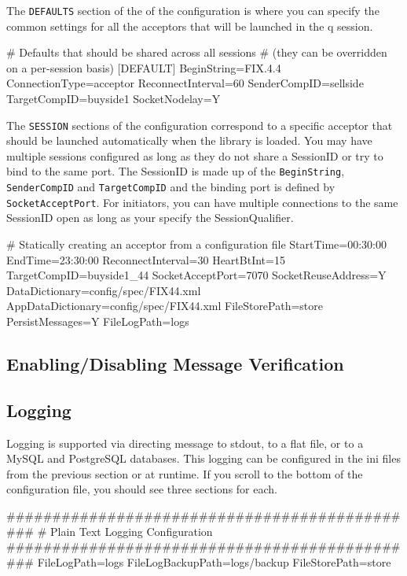The \verb|DEFAULTS| section of the of the configuration is where you can specify the common settings
for all the acceptors that will be launched in the q session.

\begin{inicode}
# Defaults that should be shared across all sessions
# (they can be overridden on a per-session basis)
[DEFAULT]
BeginString=FIX.4.4
ConnectionType=acceptor
ReconnectInterval=60
SenderCompID=sellside
TargetCompID=buyside1
SocketNodelay=Y
\end{inicode}

The \verb|SESSION| sections of the configuration correspond to a specific acceptor that should be 
launched automatically when the library is loaded. You may have multiple sessions configured as long
as they do not share a SessionID or try to bind to the same port. The SessionID is made up of the \verb|BeginString|, \verb|SenderCompID| and \verb|TargetCompID| and the binding port is defined by
\verb|SocketAcceptPort|. For initiators, you can have multiple connections to the same SessionID open as long as your specify the SessionQualifier. 

\begin{inicode}
[SESSION]
# Statically creating an acceptor from a configuration file
StartTime=00:30:00
EndTime=23:30:00
ReconnectInterval=30
HeartBtInt=15
TargetCompID=buyside1_44
SocketAcceptPort=7070
SocketReuseAddress=Y
DataDictionary=config/spec/FIX44.xml
AppDataDictionary=config/spec/FIX44.xml
FileStorePath=store
PersistMessages=Y
FileLogPath=logs
\end{inicode}

\subsection{Enabling/Disabling Message Verification}

\subsection{Logging}
Logging is supported via directing message to stdout, to a flat file, or to a MySQL and PostgreSQL databases. This logging can be configured in the ini files from the previous section or at runtime. If you scroll to the bottom of the configuration file, you should see three sections for each.

\begin{inicode}
	##############################################
	#       Plain Text Logging Configuration 
	##############################################
	FileLogPath=logs
	FileLogBackupPath=logs/backup
	FileStorePath=store
\end{inicode}

